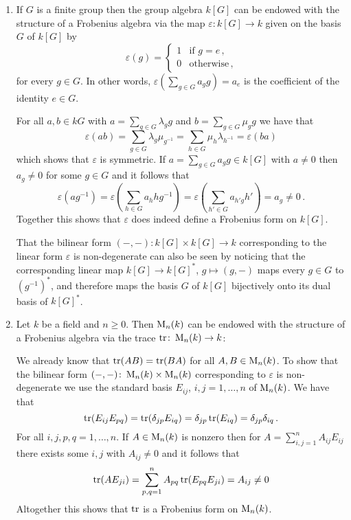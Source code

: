 \begin{example}
  \leavevmode
  \begin{enumerate}
    \item
      If $G$ is a finite group then the group algebra $k[G]$ can be endowed with the structure of a Frobenius algebra via the map $\varepsilon \colon k[G] \to k$ given on the basis $G$ of $k[G]$ by
      \[
          \varepsilon(g)
        = \begin{cases}
            1 & \text{if $g = e$} \,, \\
            0 & \text{otherwise}  \,,
          \end{cases}
      \]
      for every $g \in G$.
      In other words, $\varepsilon(\sum_{g \in G} a_g g) = a_e$ is the coefficient of the identity $e \in G$.
      
      For all $a, b \in kG$ with $a = \sum_{g \in G} \lambda_g g$ and $b = \sum_{g \in G} \mu_g g$ we have that
      \[
          \varepsilon(ab)
        = \sum_{g \in G} \lambda_g \mu_{g^{-1}}
        = \sum_{h \in G} \mu_h \lambda_{h^{-1}}
        = \varepsilon(ba)
      \]
      which shows that $\varepsilon$ is symmetric.
      If $a = \sum_{g \in G} a_g g \in k[G]$ with $a \neq 0$ then $a_g \neq 0$ for some $g \in G$ and it follows that
      \[
              \varepsilon(a g^{-1})
        =     \varepsilon\left( \sum_{h \in G} a_h h g^{-1} \right)
        =     \varepsilon\left( \sum_{h' \in G} a_{h' g} h' \right)
        =     a_g
        \neq  0 \,.
      \]
      Together this shows that $\varepsilon$ does indeed define a Frobenius form on $k[G]$.
      
      That the bilinear form $(-,-) \colon k[G] \times k[G] \to k$ corresponding to the linear form $\varepsilon$ is non-degenerate can also be seen by noticing that the corresponding linear map $k[G] \to k[G]^*$, $g \mapsto (g,-)$ maps every $g \in G$ to $(g^{-1})^*$, and therefore maps the basis $G$ of $k[G]$ bijectively onto its dual basis of $k[G]^*$.
    \item
      Let $k$ be a field and $n \geq 0$.
      Then $\operatorname{M}_n(k)$ can be endowed with the structure of a Frobenius algebra via the trace $\operatorname{tr} \colon \operatorname{M}_n(k) \to k$:
      
      We already know that $\operatorname{tr}(AB) = \operatorname{tr}(BA)$ for all $A, B \in \operatorname{M}_n(k)$.
      To show that the bilinear form $(-,-) \colon \operatorname{M}_n(k) \times \operatorname{M}_n(k)$ corresponding to $\varepsilon$ is non-degenerate we use the standard basis $E_{ij}$, $i,j = 1, \dotsc, n$ of $\operatorname{M}_n(k)$.
      We have that
      \[
          \operatorname{tr}( E_{ij} E_{pq} )
        = \operatorname{tr}( \delta_{jp} E_{iq} )
        = \delta_{jp} \operatorname{tr}(E_{iq})
        = \delta_{jp} \delta_{iq} \,.
      \]
      For all $i,j,p,q = 1, \dotsc, n$.
      If $A \in \operatorname{M}_n(k)$ is nonzero then for $A = \sum_{i,j=1}^n A_{ij} E_{ij}$ there exists some $i,j$ with $A_{ij} \neq 0$ and it follows that
      \[
              \operatorname{tr}( A E_{ji} )
        =     \sum_{p,q=1}^n A_{pq} \operatorname{tr}( E_{pq} E_{ji} )
        =     A_{ij}
        \neq  0
      \]
      Altogether this shows that $\operatorname{tr}$ is a Frobenius form on $\operatorname{M}_n(k)$.
  \end{enumerate}
\end{example}


